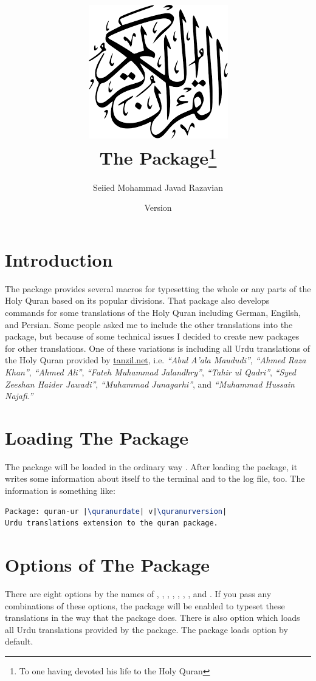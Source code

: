 \documentclass[a4paper]{ltxdoc}
\title{\includegraphics[scale=.3]{quran.png}\\
The \xpackage{quran-ur} Package\footnote{To one having devoted his life to the Holy Quran}}
\author{Seiied Mohammad Javad Razavian\\\xemail{javadr@gmail.com}}
\date{\quranurdate\space Version \quranurversion}
\begin{document}
\maketitle

\tableofcontents

\vfill
\section{Introduction}
The  package provides several macros for
typesetting the whole or any parts of the Holy Quran based on its popular divisions.
That package also develops
commands for some translations of the Holy Quran including German, Engilsh, and Persian.
Some people asked me to include the other translations into the  package,
but because of some technical issues I decided to create new packages for other translations.
One of these variations is  including all Urdu translations of the Holy Quran
provided by \url{tanzil.net}, i.e.
\emph{``Abul A'ala Maududi''}, \emph{``Ahmed Raza Khan''},
\emph{``Ahmed Ali''}, \emph{``Fateh Muhammad Jalandhry''},
\emph{``Tahir ul Qadri''}, \emph{``Syed Zeeshan Haider Jawadi''},
\emph{``Muhammad Junagarhi''}, and \emph{``Muhammad Hussain Najafi.''}


\newpage
\section{Loading The Package}
The package will be loaded in the ordinary way
.
After loading the package, it writes some information about itself to the
terminal and to the log file, too. The information is something like:

\begin{lstlisting}[style=BashInputStyle, language=tex, escapechar={|}]
Package: quran-ur |\quranurdate| v|\quranurversion|
Urdu translations extension to the quran package.
\end{lstlisting}


\section{Options of The Package}\label{sec:qurantypesetting}
There are eight options by the names of , , ,
, , , , and .
If you pass any combinations of these options, the package will be enabled to typeset these translations in the way that the  package does.
There is also  option which loads all Urdu translations provided by the  package.
The package loads  option by default.
\end{document}
